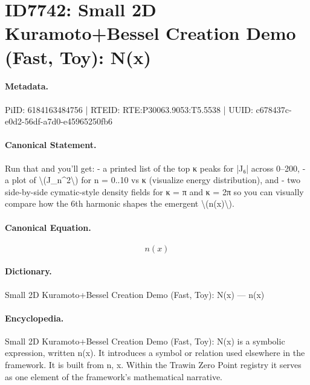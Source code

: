 \section*{ID7742: Small 2D Kuramoto+Bessel Creation Demo (Fast, Toy): N(x)}
\paragraph{Metadata.}
PiID: 6184163484756 | RTEID: RTE:P30063.9053:T5.5538 | UUID: c678437c-e0d2-56df-a7d0-e45965250fb6

\paragraph{Canonical Statement.}
Run that and you’ll get: - a printed list of the top κ peaks for |J₆| across 0–200, - a plot of \textbackslash{}(J\_n\textasciicircum{}2\textbackslash{}) for n = 0..10 vs κ (visualize energy distribution), and - two side-by-side cymatic-style density fields for κ = π and κ = 2π so you can visually compare how the 6th harmonic shapes the emergent \textbackslash{}(n(x)\textbackslash{}).

\paragraph{Canonical Equation.}
\[
n(x)
\]

\paragraph{Dictionary.}
Small 2D Kuramoto+Bessel Creation Demo (Fast, Toy): N(x) — n(x)

\paragraph{Encyclopedia.}
Small 2D Kuramoto+Bessel Creation Demo (Fast, Toy): N(x) is a symbolic expression, written n(x). It introduces a symbol or relation used elsewhere in the framework. It is built from n, x. Within the Trawin Zero Point registry it serves as one element of the framework's mathematical narrative.
